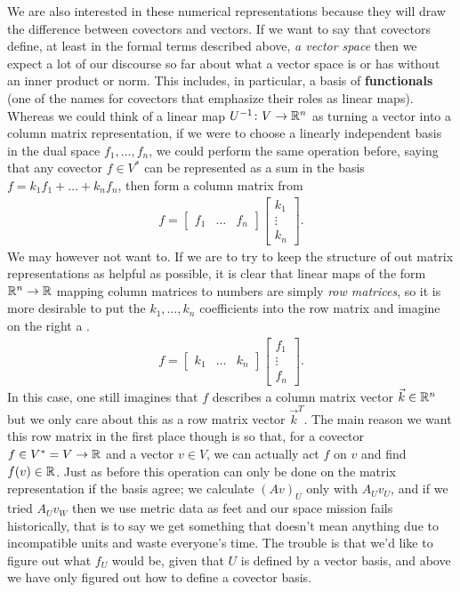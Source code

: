 \documentclass[11pt]{article}
\begin{document}
We are also interested in these numerical representations because they will draw the difference between covectors and vectors. If we want to say that covectors define, at least in the formal terms described above, \emph{a vector space} then we expect a lot of our discourse so far about what a vector space is or has without an inner product or norm. This includes, in particular, a basis of \textbf{functionals} (one of the names for covectors that emphasize their roles as linear maps). Whereas we could think of a linear map $U^{-1} \colon V \to \mathbb{R}^n$ as turning a vector into a column matrix representation, if we were to choose a linearly independent basis in the dual space $f_1, \dots, f_n$, we could perform the same operation before, saying that any covector $f \in V^*$ can be represented as a sum in the basis $f = k_1 f_1 + \dots + k_n f_n$, then form a column matrix from \begin{gather*}
f = \begin{bmatrix} f_1 & \dots & f_n \end{bmatrix} \begin{bmatrix} k_1 \\ \vdots \\ k_n \end{bmatrix}.
\end{gather*}
We may however not want to. If we are to try to keep the structure of out matrix representations as helpful as possible, it is clear that linear maps of the form $\mathbb{R}^n \to \mathbb{R}$ mapping column matrices to numbers are simply \emph{row matrices}, so it is more desirable to put the $k_1,\dots, k_n$ coefficients into the row matrix and imagine on the right a . \begin{gather*}
f = \begin{bmatrix} k_1 & \dots & k_n \end{bmatrix} \begin{bmatrix} f_1 \\ \vdots \\ f_n \end{bmatrix}.
\end{gather*}
In this case, one still imagines that $f$ describes a column matrix vector $\vec k \in \mathbb{R}^n$ but we only care about this as a row matrix vector $\vec k^T$. The main reason we want this row matrix in the first place though is so that, for a covector $f \in V^* = V \to \mathbb{R}$ and a vector $v \in V$, we can actually act $f$ on $v$ and find $f(v) \in \mathbb{R}$. Just as before this operation can only be done on the matrix representation if the basis agree; we calculate $(Av)_U$ only with $A_U v_U$, and if we tried $A_U v_W$ then we use metric data as feet and our space mission fails historically, that is to say we get something that doesn't mean anything due to incompatible units and waste everyone's time. The trouble is that we'd like to figure out what $f_U$ would be, given that $U$ is defined by a vector basis, and above we have only figured out how to define a covector basis.
\end{document}
